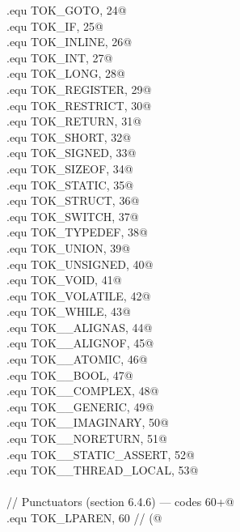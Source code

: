 \documentclass[11pt,a4paper,twoside,openright,DIV=15]{scrbook}
\theoremstyle{definition}
\theoremstyle{plain}
\theoremstyle{remark}
\begin{document}
\begin{flushleft}
\begin{minipage}{\linewidth}
\begin{list}{}{}
\mbox{}\verb@.equ TOK_GOTO,        24@\\
\mbox{}\verb@.equ TOK_IF,          25@\\
\mbox{}\verb@.equ TOK_INLINE,      26@\\
\mbox{}\verb@.equ TOK_INT,         27@\\
\mbox{}\verb@.equ TOK_LONG,        28@\\
\mbox{}\verb@.equ TOK_REGISTER,    29@\\
\mbox{}\verb@.equ TOK_RESTRICT,    30@\\
\mbox{}\verb@.equ TOK_RETURN,      31@\\
\mbox{}\verb@.equ TOK_SHORT,       32@\\
\mbox{}\verb@.equ TOK_SIGNED,      33@\\
\mbox{}\verb@.equ TOK_SIZEOF,      34@\\
\mbox{}\verb@.equ TOK_STATIC,      35@\\
\mbox{}\verb@.equ TOK_STRUCT,      36@\\
\mbox{}\verb@.equ TOK_SWITCH,      37@\\
\mbox{}\verb@.equ TOK_TYPEDEF,     38@\\
\mbox{}\verb@.equ TOK_UNION,       39@\\
\mbox{}\verb@.equ TOK_UNSIGNED,    40@\\
\mbox{}\verb@.equ TOK_VOID,        41@\\
\mbox{}\verb@.equ TOK_VOLATILE,    42@\\
\mbox{}\verb@.equ TOK_WHILE,       43@\\
\mbox{}\verb@.equ TOK__ALIGNAS,    44@\\
\mbox{}\verb@.equ TOK__ALIGNOF,    45@\\
\mbox{}\verb@.equ TOK__ATOMIC,     46@\\
\mbox{}\verb@.equ TOK__BOOL,       47@\\
\mbox{}\verb@.equ TOK__COMPLEX,    48@\\
\mbox{}\verb@.equ TOK__GENERIC,    49@\\
\mbox{}\verb@.equ TOK__IMAGINARY,  50@\\
\mbox{}\verb@.equ TOK__NORETURN,   51@\\
\mbox{}\verb@.equ TOK__STATIC_ASSERT, 52@\\
\mbox{}\verb@.equ TOK__THREAD_LOCAL,  53@\\
\mbox{}\verb@@\\
\mbox{}\verb@// Punctuators (section 6.4.6) — codes 60+@\\
\mbox{}\verb@.equ TOK_LPAREN,      60      // (@\\

\end{list}
\end{minipage}
\end{flushleft}
\end{document}
